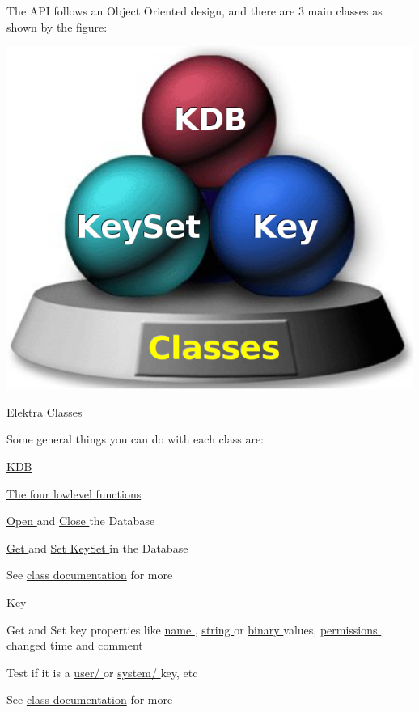The A\-P\-I follows an Object Oriented design, and there are 3 main classes as shown by the figure\-:


\begin{DoxyImage}
\includegraphics{classes.png}
\caption{Elektra Classes}
\end{DoxyImage}
 Some general things you can do with each class are\-:

\hyperlink{group__kdb}{K\-D\-B }
\begin{DoxyItemize}
\item \hyperlink{group__kdb}{The four lowlevel functions }
\item \hyperlink{group__kdb_ga6808defe5870f328dd17910aacbdc6ca}{Open } and \hyperlink{group__kdb_gadb54dc9fda17ee07deb9444df745c96f}{Close } the Database
\item \hyperlink{group__kdb_ga28e385fd9cb7ccfe0b2f1ed2f62453a1}{Get } and \hyperlink{group__kdb_ga11436b058408f83d303ca5e996832bcf}{Set } \hyperlink{group__keyset}{Key\-Set } in the Database
\item See \hyperlink{group__kdb}{class documentation} for more
\end{DoxyItemize}

\hyperlink{group__key}{Key }
\begin{DoxyItemize}
\item Get and Set key properties like \hyperlink{group__keyname_ga7699091610e7f3f43d2949514a4b35d9}{name }, \hyperlink{group__keyvalue_ga622bde1eb0e0c4994728331326340ef2}{string } or \hyperlink{group__keyvalue_gaa50a5358fd328d373a45f395fa1b99e7}{binary } values, \hyperlink{group__meta_gabc0cec592ce3b77e9bc33dbc8e8f6bdc}{permissions }, \hyperlink{group__meta_ga57689eb5691679071463b777ae786ae9}{changed time } and \hyperlink{group__meta_gafb89735689929ff717cc9f2d0d0b46a2}{comment }
\item Test if it is a \hyperlink{group__keytest_ga373acc20c6209357045891f4b0c70041}{{\ttfamily user/} } or \hyperlink{group__keytest_gafe49cfb61c2accb3073131c23a56fb14}{{\ttfamily system/} } key, etc
\item See \hyperlink{group__key}{class documentation} for more
\end{DoxyItemize}


